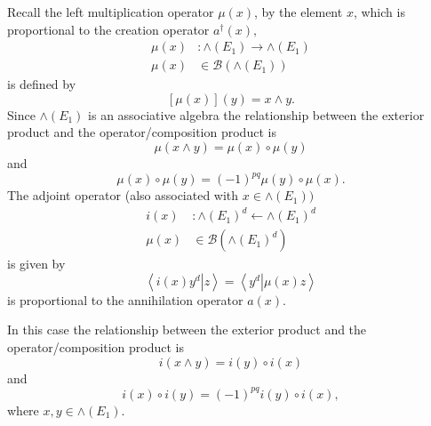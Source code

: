 \documentclass[aps,preprint]{revtex4}%
\begin{document}
Recall the left multiplication operator $\mu\left(  x\right)  $, by the
element $x$, which is proportional to the creation operator $a^{\dagger
}\left(  x\right)  ,$
\begin{align}
\mu\left(  x\right)   &  :\wedge\left(  E_{1}\right)  \rightarrow\wedge\left(
E_{1}\right) \\
\mu\left(  x\right)   &  \in\mathcal{B}\left(  \wedge\left(  E_{1}\right)
\right)
\end{align}
is defined by
\begin{equation}
\left[  \mu\left(  x\right)  \right]  \left(  y\right)  =x\wedge y.
\end{equation}
Since $\wedge\left(  E_{1}\right)  $ is an associative algebra the
relationship between the exterior product and the operator/composition product
is
\begin{equation}
\mu\left(  x\wedge y\right)  =\mu\left(  x\right)  \circ\mu\left(  y\right)
\end{equation}
and
\begin{equation}
\mu\left(  x\right)  \circ\mu\left(  y\right)  =\left(  -1\right)  ^{pq}%
\mu\left(  y\right)  \circ\mu\left(  x\right)  .
\end{equation}
The adjoint operator (also associated with $x\in\wedge\left(  E_{1}\right)
)$
\begin{align}
i\left(  x\right)   &  :\wedge\left(  E_{1}\right)  ^{d}\leftarrow
\wedge\left(  E_{1}\right)  ^{d}\\
\mu\left(  x\right)   &  \in\mathcal{B}\left(  \wedge\left(  E_{1}\right)
^{d}\right)
\end{align}
is given by%
\begin{equation}
\left\langle \left.  i\left(  x\right)  y^{d}\right\vert z\right\rangle
=\left\langle \left.  y^{d}\right\vert \mu\left(  x\right)  z\right\rangle
\end{equation}
is proportional to the annihilation operator $a\left(  x\right)  .$

In this case the relationship between the exterior product and the
operator/composition product is%
\begin{equation}
i\left(  x\wedge y\right)  =i\left(  y\right)  \circ i\left(  x\right)
\end{equation}
and
\begin{equation}
i\left(  x\right)  \circ i\left(  y\right)  =\left(  -1\right)  ^{pq}i\left(
y\right)  \circ i\left(  x\right)  ,
\end{equation}
where $x,y\in\wedge\left(  E_{1}\right)  .$
\end{document}
